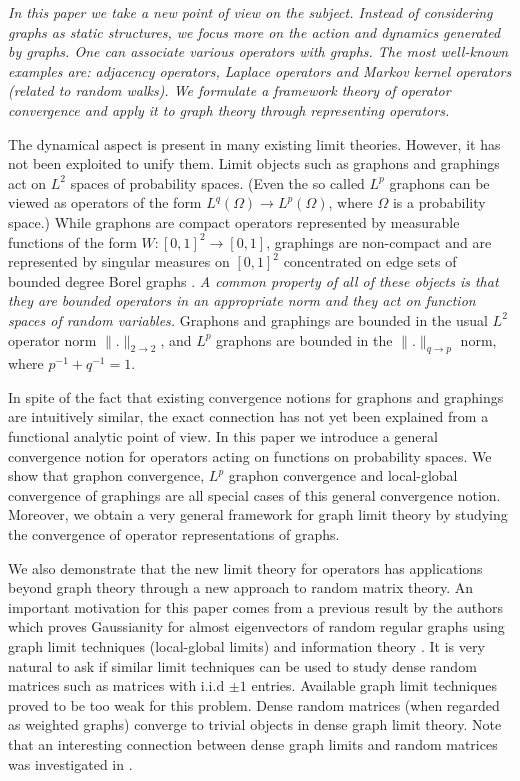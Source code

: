 \documentclass[a4wider]{amsart}
\theoremstyle{definitionbreak}\newtheorem{D}[theorem]{Definition}
\theoremstyle{definitionbreak}\newtheorem*{D*}{Definition}
\begin{document}
{\it In this paper we take a new point of view on the subject. Instead of considering graphs as static structures, we focus more on the action and dynamics generated by graphs. One can associate various operators with graphs. The most well-known examples are: adjacency operators, Laplace operators and Markov kernel operators (related to random walks). We formulate a framework theory of operator convergence and apply it to graph theory through representing operators.} 


The dynamical aspect is present in many existing limit theories. However, it has not been exploited to unify them. Limit objects such as graphons and graphings act on $L^2$ spaces of probability spaces. (Even the so called $L^p$ graphons can be viewed as operators of the form $L^q(\Omega)\to L^p(\Omega)$, where $\Omega$ is a probability space.) While graphons are compact operators represented by measurable functions of the form $W:[0,1]^2\to [0,1]$, graphings are non-compact and are represented by singular measures on $[0,1]^2$ concentrated on edge sets of bounded degree Borel graphs \cite{EG, HLSz}. {\it A common property of all of these objects is that they are bounded operators in an appropriate norm and they act on function spaces of random variables.} Graphons and graphings are bounded in the usual $L^2$ operator norm $\|.\|_{2\to 2}$, and $L^p$ graphons are bounded in the $\|.\|_{q\to p}$ norm, where $p^{-1}+q^{-1}=1$.

In spite of the fact that existing convergence notions for graphons and graphings are intuitively similar, the exact connection has not yet been explained from a functional analytic point of view. In this paper we introduce a general convergence notion for operators acting on functions on probability spaces. We show that graphon convergence, $L^p$ graphon convergence and local-global convergence of graphings are all special cases of this general convergence notion. Moreover, we obtain a very general framework for graph limit theory by studying the convergence of operator representations of graphs. 

We also demonstrate that the new limit theory for operators has applications beyond graph theory through a new approach to random matrix theory.  
An important motivation for this paper comes from a previous result by the authors which proves Gaussianity for almost eigenvectors of random regular graphs using graph limit techniques (local-global limits) and information theory \cite{almost}. It is very natural to ask if similar limit techniques can be used to study dense random matrices such as matrices with i.i.d $\pm 1$ entries. Available graph limit techniques proved to be too weak for this problem. Dense random matrices (when regarded as weighted graphs) converge to trivial objects in dense graph limit theory. Note that an interesting connection between dense graph limits and random matrices was investigated in  \cite{male, zhu}.
\end{document}
